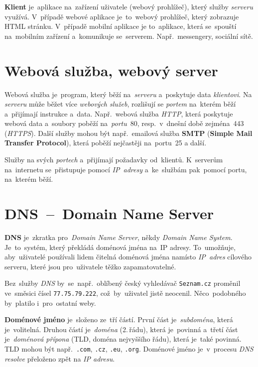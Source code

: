 \documentclass[11pt,a4paper]{report}
\begin{document}
            \textbf{Klient} je~aplikace na~zařízení uživatele (webový prohlížeč), který služby \emph{serveru} využívá. V~případě webové aplikace je~to~webový prohlížeč, který zobrazuje HTML stránku. V~případě mobilní aplikace je to~aplikace, která se~spouští na~mobilním zařízení a~komunikuje se~serverem. Např.~messengery, sociální sítě. \cite{ClientServer}

        \section{Webová služba, webový server}
            Webová služba je~program, který běží na~\emph{serveru} a~poskytuje data \emph{klientovi}. Na \emph{serveru} může běžet více \emph{webových služeb}, rozlišují se \emph{portem} na~kterém běží a~přijímají instrukce a~data. Např.~webová služba \emph{HTTP}, která poskytuje webová data a~soubory poběží na~\emph{portu}~80, resp.~v~dnešní době zejména~443 (\emph{HTTPS}). Další služby mohou být např.~emailová služba \textbf{SMTP} (\textbf{Simple Mail Transfer Protocol}), která poběží nejčastěji na~portu~25 a další.
            
            Služby  na svých \emph{portech} a~přijímají požadavky od~klientů. K~serverům na~internetu se~přistupuje pomocí \emph{IP~adresy} a~ke~službám pak~pomocí portu, na~kterém běží. \cite{webserver:mdn}

        \section{DNS~--~Domain Name Server}
            \textbf{DNS} je~zkratka pro~\emph{Domain Name Server}, někdy \emph{Domain Name System}. Je~to~systém, který překládá doménová jména na~IP adresy. To~umožňuje, aby~uživatelé používali lidem čitelná doménová jména namísto \emph{IP~adres} cílového serveru, které jsou pro~uživatele těžko zapamatovatelné.
            
            Bez~služby \emph{DNS} by~se~např.~oblíbený český vyhledávač \texttt{Seznam.cz} proměnil ve~směsici čísel \texttt{77.75.79.222}, což~by~uživatel jistě neocenil. Něco~podobného by~platilo i~pro~ostatní weby.

            \textbf{Doménové jméno} je~složeno ze~tří částí. První část je~\emph{subdoména}, která je~volitelná. Druhou částí je~\emph{doména} (2.\,řádu), která je~povinná a~třetí část je~\emph{doménová přípona} (TLD, doména nejvyššího řádu), která je~také povinná. TLD mohou být např.~\texttt{.com}, \texttt{.cz}, \texttt{.eu}, \texttt{.org}. Doménové jméno je~v~procesu \emph{DNS resolve} přeloženo zpět na \emph{IP adresu}. \cite{tld:mdn}
        
\end{document}
